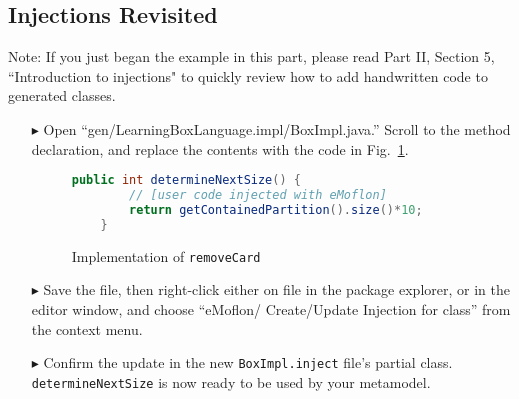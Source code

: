 \subsection{Injections Revisited}
\genHeader

Note: If you just began the example in this part, please read Part II, Section 5, ``Introduction to injections" to quickly review how to add handwritten code to
generated classes. 


\begin{itemize}

\item[$\blacktriangleright$] Open ``gen/LearningBoxLanguage.impl/BoxImpl.java.'' Scroll to the method declaration, and
replace the contents with the code in Fig.~\ref{code:determineNextSize_impl}.

\begin{figure}[htbp]
        \centering
        \begin{lstlisting}[language=Java, keywordstyle={\bfseries\color{purple}}, backgroundcolor=\color{white}]
    public int determineNextSize() {
    	// [user code injected with eMoflon]
        return getContainedPartition().size()*10;
    }
        \end{lstlisting}
        \caption{Implementation of \texttt{removeCard}}
        \label{code:determineNextSize_impl}
\end{figure}


\item[$\blacktriangleright$] Save the file, then right-click either on file in the package explorer, or in the editor window, and choose ``eMoflon/
Create/Update Injection for class'' from the context menu. 

\item[$\blacktriangleright$] Confirm the update in the new \texttt{BoxImpl.inject} file's partial class. \texttt{determineNextSize} is now ready to be used by
your metamodel.

\end{itemize}
